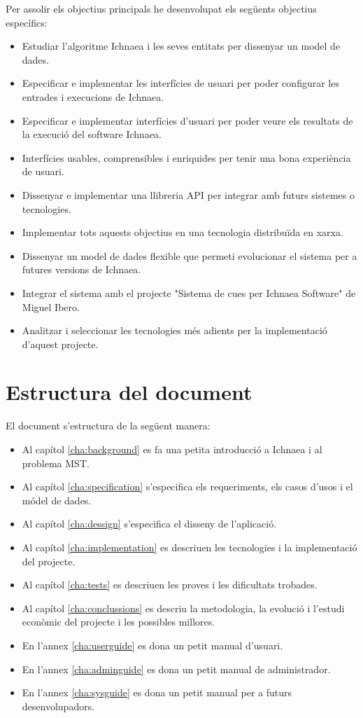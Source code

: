 Per assolir els objectius principals he desenvolupat els següents objectius específics:
\begin{itemize}
\item Estudiar l'algoritme Ichnaea i les seves entitats per dissenyar un model de dades.
\item Especificar e implementar les interf\'{i}cies de usuari per poder configurar les entrades i execucions de Ichnaea.
\item Especificar e implementar interf\'{i}cies d'usuari per poder veure els resultats de la execuci\'{o} del software Ichnaea. 
\item Interf\'{i}cies usables, comprensibles i enriquides per tenir una bona experiència de usuari. 
\item Dissenyar e implementar una llibreria API per integrar amb futurs sistemes o tecnologies.
\item Implementar tots aquests objectius en una tecnologia distribuïda en xarxa. 
\item Dissenyar un model de dades flexible que permeti evolucionar el sistema per a futures versions de Ichnaea.
\item Integrar el sistema amb el projecte "Sistema de cues per Ichnaea Software" de Miguel Ibero.
\item Analitzar i seleccionar les tecnologies m\'{e}s adients per la implementació d'aquest projecte.
\end{itemize}

\section{Estructura del document}
El document s'estructura de la següent manera:
\begin{itemize}
\item Al cap\'{i}tol \ref{cha:background} es fa una petita introducci\'{o} a Ichnaea i al problema MST. 
\item Al cap\'{i}tol \ref{cha:specification} s'especifica els requeriments, els casos d'usos i el m\'{o}del de dades.
\item Al cap\'{i}tol \ref{cha:dessign} s'especifica el disseny de l'aplicació.
\item Al capítol \ref{cha:implementation} es descriuen les tecnologies i la implementació del projecte.
\item Al capítol \ref{cha:tests} es descriuen les proves i les dificultats trobades.
\item Al cap\'{i}tol \ref{cha:conclussions} es descriu la metodologia, la evolució i l'estudi econòmic del projecte i les possibles millores.
\item En l'annex \ref{cha:userguide} es dona un petit manual d'usuari.
\item En l'annex \ref{cha:adminguide} es dona un petit manual de administrador.
\item En l'annex \ref{cha:sysguide} es dona un petit manual per a futurs desenvolupadors.
\end{itemize}

